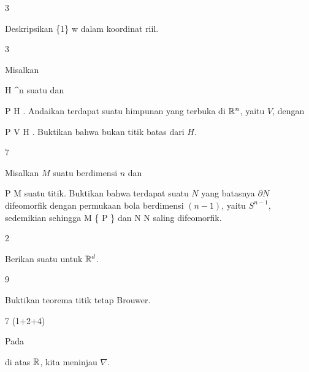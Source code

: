 {3}
{

Deskripsikan
\maabbeledisp {\psi} { \Complex \setminus \{1\} } { \Complex
} {w} { {  }
} {}
dalam koordinat riil.

}
{} {}

{3}
{

Misalkan

\mavergleichskette
{\vergleichskette
{ H
}
{ \subseteq }{ \R^n
}
{  }{
}
{    }{
}
{   }{
}
}
{}{}{}
suatu
dan

\mavergleichskette
{\vergleichskette
{ P
}
{ \in }{ H
}
{  }{
}
{    }{
}
{   }{
}
}
{}{}{.}
Andaikan terdapat suatu himpunan yang terbuka di ${\mathbb R}^n$, yaitu $V$, dengan

\mavergleichskette
{\vergleichskette
{ P
}
{ \in }{ V
}
{ \subseteq }{ H
}
{    }{
}
{   }{
}
}
{}{}{.}
Buktikan bahwa
 bukan titik batas dari $H$.

}
{} {}

{7}
{

Misalkan $M$ suatu
berdimensi $n$ dan

\mavergleichskette
{\vergleichskette
{ P
}
{ \in }{ M
}
{  }{
}
{    }{
}
{   }{
}
}
{}{}{}
suatu titik. Buktikan bahwa terdapat suatu
$N$ yang batasnya $\partial N$ difeomorfik dengan permukaan bola berdimensi $(n-1)$, yaitu $S^{n-1}$, sedemikian sehingga
\mathkor {} {M \setminus \{ P \}} {dan} {N \setminus \partial N} {}
saling difeomorfik.

}
{} {}

{2}
{

Berikan suatu
untuk ${\mathbb R}^d$.

}
{} {}

{9}
{

Buktikan teorema titik tetap Brouwer.

}
{} {}

{7 (1+2+4)}
{

Pada

 di atas ${\mathbb R}$, kita meninjau
$\nabla$.

}
{} {}
